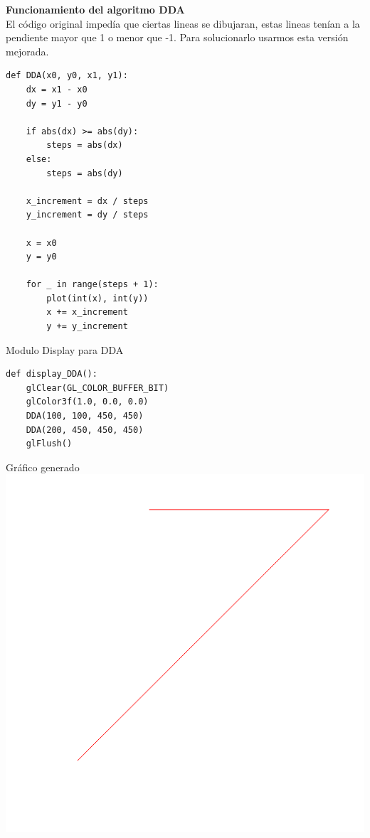 \documentclass[a4paper]{article}
\begin{document}
\restoregeometry
\newpage
\Large{\textbf{Funcionamiento del algoritmo DDA}}\\[0.5cm]
El código original impedía que ciertas lineas se dibujaran, estas lineas tenían a la pendiente mayor que 1 o menor que -1. Para solucionarlo usarmos esta versión mejorada.
\begin{center}
\begin{mycodebox}
\begin{lstlisting}
def DDA(x0, y0, x1, y1):
    dx = x1 - x0
    dy = y1 - y0

    if abs(dx) >= abs(dy):
        steps = abs(dx)
    else:
        steps = abs(dy)

    x_increment = dx / steps
    y_increment = dy / steps

    x = x0
    y = y0

    for _ in range(steps + 1):
        plot(int(x), int(y))
        x += x_increment
        y += y_increment
\end{lstlisting}
\end{mycodebox}
\end{center}
Modulo Display para DDA
\begin{center}
\begin{mycodebox}
\begin{lstlisting}
def display_DDA():
    glClear(GL_COLOR_BUFFER_BIT)
    glColor3f(1.0, 0.0, 0.0)
    DDA(100, 100, 450, 450)
    DDA(200, 450, 450, 450)
    glFlush()
\end{lstlisting}
\end{mycodebox}
\end{center}
\newpage
Gráfico generado\\
\includegraphics[width=15cm]{src/bresenham.png}
\newpage
\end{document}
